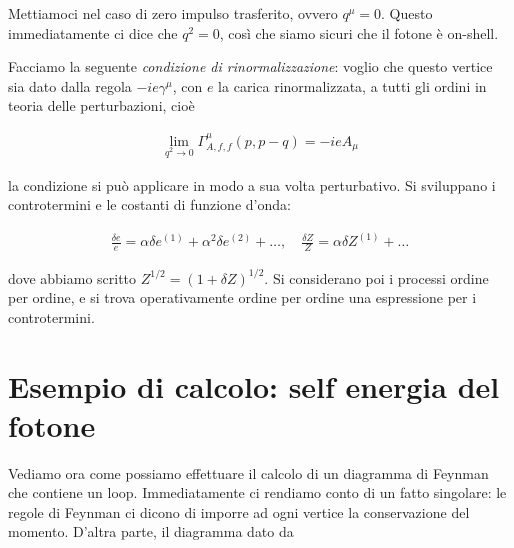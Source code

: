 \documentclass[11pt]{report}
\begin{document}
\begin{center}
\end{center}

Mettiamoci nel caso di zero impulso trasferito, ovvero  \(q^\mu = 0\). Questo immediatamente ci dice che \(q^2=0\), così che siamo sicuri che il fotone è on-shell. 

Facciamo la seguente \emph{condizione di rinormalizzazione}: voglio che questo vertice sia dato dalla regola \(-ie\gamma^\mu\), con \(e\) la carica rinormalizzata, a tutti gli ordini in teoria delle perturbazioni, cioè 

\begin{align}
    \lim_{q^2 \rightarrow 0}\Gamma^\mu_{A, f, f}(p, p-q) = -ieA_\mu
\end{align}

la condizione si può applicare in modo a sua volta perturbativo. Si sviluppano i controtermini e le costanti di funzione d'onda: 

\begin{align}
    \frac{\delta e}{e} = \alpha \delta e^{(1)} + \alpha^2 \delta e^{(2)} + \ldots,   \quad \frac{\delta Z}{Z}  = \alpha \delta Z^{(1)} + \ldots
\end{align}

dove abbiamo scritto \(Z^{1/2} = (1+\delta Z)^{1/2}\). Si considerano poi i processi ordine per ordine, e si trova operativamente ordine per ordine una espressione per i controtermini. 

\section{Esempio di calcolo: self energia del fotone}

Vediamo ora come possiamo effettuare il calcolo di un diagramma di Feynman che contiene un loop. Immediatamente ci rendiamo conto di un fatto singolare: le regole di Feynman ci dicono di imporre ad ogni vertice la conservazione del momento. D'altra parte, il diagramma dato da 
\end{document}
